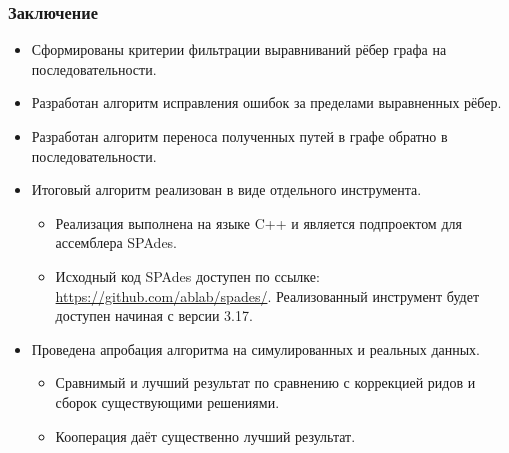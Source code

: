 \documentclass[aspectratio=169]{beamer}
\begin{document}
\begin{frame}\frametitle{Заключение}
\begin{itemize}
    \item Сформированы критерии фильтрации выравниваний рёбер графа на последовательности.
    \item Разработан алгоритм исправления ошибок за пределами выравненных рёбер.
    \item Разработан алгоритм переноса полученных путей в графе обратно в последовательности.
    \item Итоговый алгоритм реализован в виде отдельного инструмента.
    \begin{itemize}
        \item Реализация выполнена на языке C++ и является подпроектом для ассемблера SPAdes.
        \item \begin{sloppypar} Исходный код SPAdes доступен по ссылке: \mbox{\url{https://github.com/ablab/spades/}}. Реализованный инструмент будет доступен начиная с версии 3.17. \end{sloppypar}
    \end{itemize}
    \item Проведена апробация алгоритма на симулированных и реальных данных.
    \begin{itemize}
        \item Сравнимый и лучший результат по сравнению с коррекцией ридов и сборок существующими решениями.
        \item Кооперация даёт существенно лучший результат.
    \end{itemize}

\end{itemize}

\end{frame}

\end{document}
